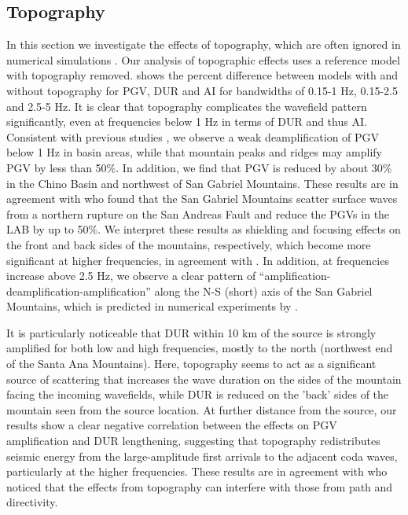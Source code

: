 \subsection{Topography}
In this section we investigate the effects of topography, which are often ignored in numerical simulations . Our analysis of topographic effects uses a reference model with topography removed.
 shows the percent difference between models with and without topography for PGV, DUR and AI for bandwidths of 0.15-1 Hz, 0.15-2.5 and 2.5-5 Hz. It is clear that topography complicates the wavefield pattern significantly, even at frequencies below 1 Hz in terms of DUR and thus AI. Consistent with previous studies , we observe a weak deamplification of PGV below 1 Hz in basin areas, while that mountain peaks and ridges may amplify PGV by less than 50\%. In addition, we find that PGV is reduced by about 30\% in the Chino Basin and northwest of San Gabriel Mountains. These results are in agreement with \citet{maEffectsLargeScaleSurface2007} who found that the San Gabriel Mountains scatter surface waves from a northern rupture on the San Andreas Fault and reduce the PGVs in the LAB by up to 50\%. We interpret these results as shielding and focusing effects on the front and back sides of the mountains, respectively, which become more significant at higher frequencies, in agreement with \citet{liuScatteringSeismicWaves2020}. In addition, at frequencies increase above 2.5 Hz, we observe a clear pattern of “amplification-deamplification-amplification” along the N-S (short) axis of the San Gabriel Mountains, which is predicted in numerical experiments by \citet{liuScatteringSeismicWaves2020}.

It is particularly noticeable that DUR within 10 km of the source is strongly amplified for both low and high frequencies, mostly to the north (northwest end of the Santa Ana Mountains). Here, topography seems to act as a significant source of scattering that increases the wave duration on the sides of the mountain facing the incoming wavefields, while DUR is reduced on the 'back' sides of the mountain seen from the source location. At further distance from the source, our results show a clear negative correlation between the effects on PGV amplification and DUR lengthening, suggesting that topography redistributes seismic energy from the large-amplitude first arrivals to the adjacent coda waves, particularly at the higher frequencies. These results are in agreement with \citet{leeEffectsRealisticSurface2009} who noticed that the effects from topography can interfere with those from path and directivity.


